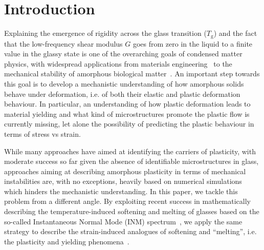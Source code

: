 \documentclass[pre,twocolumn,aps,superscriptaddress,showpacs]{revtex4-1}
\begin{document}
\section{Introduction}
Explaining the emergence of rigidity across the glass transition ($T_\text{g}$) and the fact that the low-frequency shear modulus $G$ goes from zero in the liquid to a finite value in the glassy state is one of the overarching goals of condensed matter physics, with widespread applications from materials engineering~\cite{Schuh} to the mechanical stability of amorphous biological matter~\cite{Kaminski}.
An important step towards this goal is to develop a mechanistic understanding of how amorphous solids behave under deformation, i.e. of both their elastic and plastic deformation behaviour. 
In particular, an understanding of how plastic deformation leads to material yielding and what kind of microstructures promote the plastic flow is currently missing, let alone the possibility of predicting the plastic behaviour in terms of stress vs strain. 


While many approaches have aimed at identifying the carriers of plasticity, with moderate success so far given the absence of identifiable microstructures in glass, approaches aiming at describing amorphous plasticity in terms of mechanical instabilities are, with no exceptions, heavily based on numerical simulations which hinders the mechanistic understanding. In this paper, we tackle this problem from a different angle. By exploiting recent success in mathematically describing the temperature-induced softening and melting of glasses based on the so-called Instantaneous Normal Mode (INM) spectrum~\cite{Keyes1997,Stratt1995,Starr2019,PNAS2021}, we apply the same strategy to describe the strain-induced analogues of softening and ``melting'', i.e. the plasticity and yielding phenomena~\cite{Schall}.
 
\end{document}
